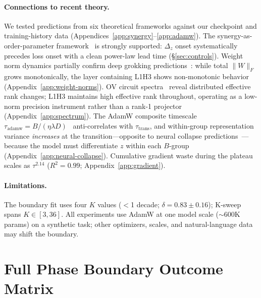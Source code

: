 \documentclass{article}
\begin{document}
\paragraph{Connections to recent theory.}
We tested predictions from six theoretical frameworks against our checkpoint and training-history data (Appendices~\ref{app:synergy}--\ref{app:adamw}).
The synergy-as-order-parameter framework~\citep{aguilera2024synergy} is strongly supported: $\Delta_z$ onset systematically precedes loss onset with a clean power-law lead time (\S\ref{sec:controls}).
Weight norm dynamics partially confirm deep grokking predictions~\citep{gromov2024grokking}: while total $\|W\|_F$ grows monotonically, the layer containing L1H3 shows non-monotonic behavior (Appendix~\ref{app:weight-norms}).
OV circuit spectra~\citep{tigges2024cdt} reveal distributed effective rank changes; L1H3 maintains high effective rank throughout, operating as a low-norm precision instrument rather than a rank-1 projector (Appendix~\ref{app:spectrum}).
The AdamW composite timescale $\tau_\text{adamw} {=} B/(\eta\lambda D)$~\citep{lyu2025power} anti-correlates with $\tau_\text{trans}$, and within-group representation variance \emph{increases} at the transition---opposite to neural collapse predictions~\citep{rangamani2025neural}---because the model must differentiate $z$ within each $B$-group (Appendix~\ref{app:neural-collapse}).
Cumulative gradient waste during the plateau scales as $\tau^{2.14}$ ($R^2 {=} 0.99$; Appendix~\ref{app:gradient}).

\paragraph{Limitations.}
The boundary fit uses four $K$ values ($<$1 decade; $\delta = 0.83 \pm 0.16$); K-sweep spans $K {\in} [3, 36]$.
All experiments use AdamW at one model scale (${\sim}600$K params) on a synthetic task; other optimizers, scales, and natural-language data may shift the boundary.



\appendix
\section{Full Phase Boundary Outcome Matrix}
\label{app:matrix}
\end{document}
